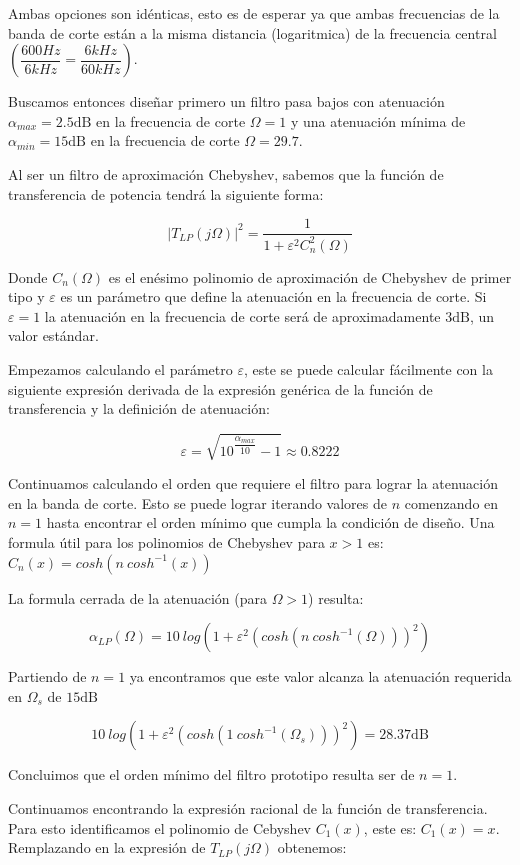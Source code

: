 \documentclass[11pt,a4paper]{report}
\begin{document}
Ambas opciones son idénticas, esto es de esperar ya que ambas frecuencias de la banda de corte están a la misma distancia (logaritmica) de la frecuencia central $\left( \dfrac{600Hz}{6kHz} = \dfrac{6kHz}{60kHz} \right)$.


Buscamos entonces diseñar primero un filtro pasa bajos con atenuación $\alpha_{max} = 2.5 \mathrm{dB}$ en la frecuencia de corte $\Omega = 1$ y una atenuación mínima de $\alpha_{min} = 15 \mathrm{dB}$ en la frecuencia de corte $\Omega = 29.7$.

Al ser un filtro de aproximación Chebyshev, sabemos que la función de transferencia de potencia tendrá la siguiente forma:

$$|T_{LP}(j\Omega)|^2 = \dfrac{1}{1 + \varepsilon^2 C_n^2(\Omega)}$$

Donde $C_n(\Omega)$ es el enésimo polinomio de aproximación de Chebyshev de primer tipo y $\varepsilon$ es un parámetro que define la atenuación en la frecuencia de corte. Si $\varepsilon = 1$ la atenuación en la frecuencia de corte será de aproximadamente $3\mathrm{dB}$, un valor estándar.

Empezamos calculando el parámetro $\varepsilon$, este se puede calcular fácilmente con la siguiente expresión derivada de la expresión genérica de la función de transferencia y la definición de atenuación:

$$\varepsilon = \sqrt{10^{\dfrac{\alpha_{max}}{10}} - 1} \approx 0.8222 $$

Continuamos calculando el orden que requiere el filtro para lograr la atenuación en la banda de corte. Esto se puede lograr iterando valores de $n$ comenzando en $n=1$ hasta encontrar el orden mínimo que cumpla la condición de diseño. Una formula útil para los polinomios de Chebyshev para $x>1$ es: $C_n(x) = cosh(n ~ cosh^{-1} (x)) $

La formula cerrada de la atenuación (para $\Omega > 1$) resulta:

$$\alpha_{LP}(\Omega) = 10 ~ log(1 + \varepsilon^2 (cosh(n ~ cosh^{-1} (\Omega)))^2)$$

Partiendo de $n=1$ ya encontramos que este valor alcanza la atenuación requerida en $\Omega_s$ de $15\mathrm{dB}$

$$10 ~ log(1 + \varepsilon^2 (cosh(1 ~ cosh^{-1} (\Omega_s)))^2) = 28.37\mathrm{dB}$$

Concluimos que el orden mínimo del filtro prototipo resulta ser de $n = 1$.

Continuamos encontrando la expresión racional de la función de transferencia. Para esto identificamos el polinomio de Cebyshev $C_1(x)$, este es: $C_1(x) = x$. Remplazando en la expresión de $T_{LP}(j\Omega)$ obtenemos:
\end{document}
